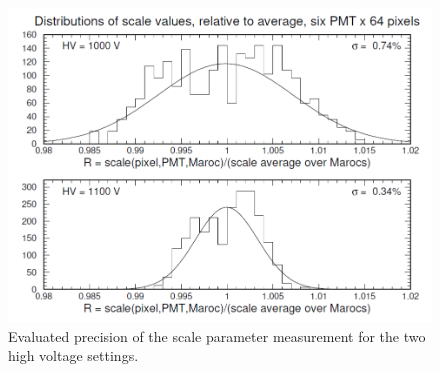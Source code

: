 \begin{figure}[h!bt]
	\centering
	\includegraphics[width=0.98\linewidth, trim=0 10 15 10, clip]{figures/R_scale_maroc_avg.png}
	\caption{Evaluated precision of the scale parameter measurement for the two high voltage settings.}
	\label{fig:R_scale_maroc_avg}
\end{figure}


